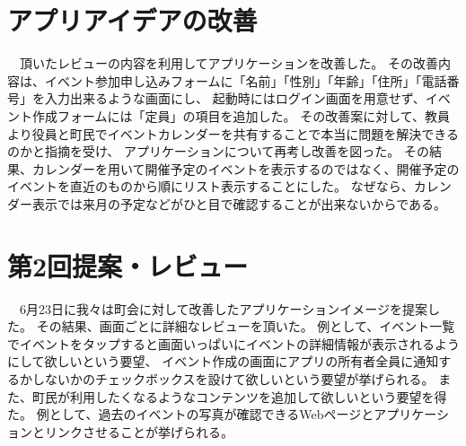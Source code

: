 \section{アプリアイデアの改善}
　頂いたレビューの内容を利用してアプリケーションを改善した。
その改善内容は、イベント参加申し込みフォームに「名前」「性別」「年齢」「住所」「電話番号」を入力出来るような画面にし、
起動時にはログイン画面を用意せず、イベント作成フォームには「定員」の項目を追加した。
その改善案に対して、教員より役員と町民でイベントカレンダーを共有することで本当に問題を解決できるのかと指摘を受け、
アプリケーションについて再考し改善を図った。
その結果、カレンダーを用いて開催予定のイベントを表示するのではなく、開催予定のイベントを直近のものから順にリスト表示することにした。
なぜなら、カレンダー表示では来月の予定などがひと目で確認することが出来ないからである。

\section{第2回提案・レビュー}
　6月23日に我々は町会に対して改善したアプリケーションイメージを提案した。
その結果、画面ごとに詳細なレビューを頂いた。
例として、イベント一覧でイベントをタップすると画面いっぱいにイベントの詳細情報が表示されるようにして欲しいという要望、
イベント作成の画面にアプリの所有者全員に通知するかしないかのチェックボックスを設けて欲しいという要望が挙げられる。
また、町民が利用したくなるようなコンテンツを追加して欲しいという要望を得た。
例として、過去のイベントの写真が確認できるWebページとアプリケーションとリンクさせることが挙げられる。
